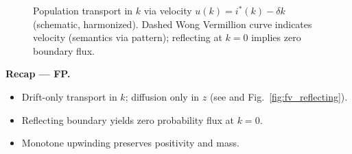 \documentclass[11pt,letterpaper,oneside]{article}
\numberwithin{equation}{section}
\newcommand{\1}{\mathbf{1}}
\begin{document}
\begin{figure}[ht]
\centering
{}
\caption{Population transport in $k$ via velocity $u(k)=i^*(k)-\delta k$ (schematic, harmonized). Dashed Wong Vermillion curve indicates velocity (semantics via pattern); reflecting at $k=0$ implies zero boundary flux.}
\label{fig:transport_uk}
\end{figure}

\begin{tcolorbox}[didacticstyle]
\textbf{Recap --- FP.}
\begin{itemize}[leftmargin=1.15em,itemsep=0.2em]
  \item Drift-only transport in $k$; diffusion only in $z$ (see  and Fig.~\ref{fig:fv_reflecting}).
  \item Reflecting boundary yields zero probability flux at $k=0$.
  \item Monotone upwinding preserves positivity and mass.
\end{itemize}
\end{tcolorbox}
\end{document}
